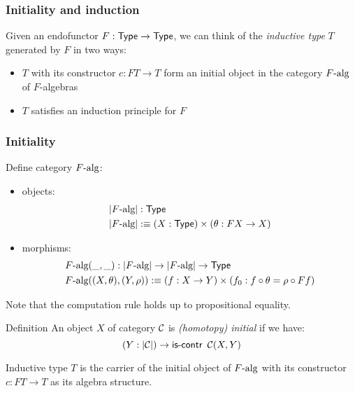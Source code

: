 \documentclass{beamer}
\begin{document}
\begin{frame}
  \frametitle{Initiality and induction}
  Given an endofunctor $F : \mathsf{Type} \to \mathsf{Type}$, we can think of the
  \emph{inductive type} $T$ generated by $F$ in two ways:

  \begin{itemize}
  \item $T$ with its constructor $c : FT \to T$ form an initial object
    in the category $F\mbox{-alg}$ of $F$-algebras
  \item $T$ satisfies an induction principle for $F$
  \end{itemize}
\end{frame}

\begin{frame}
  \frametitle{Initiality}
  Define category $F\mbox{-alg}$:
  \begin{itemize}
  \item objects:
    \begin{align*}
      &| F\mbox{-alg} | : \mathsf{Type} \\
      &| F\mbox{-alg} | :\equiv (X : \mathsf{Type}) \times (\theta : FX \to X) 
    \end{align*}

  \item morphisms: 
    \begin{align*}
      &F\mbox{-alg}(\_,\_) : | F\mbox{-alg} | \to | F\mbox{-alg} | \to \mathsf{Type} \\
      &F\mbox{-alg}((X,\theta),(Y,\rho)) :\equiv (f : X \to Y) \times (f_0 : f \circ \theta = \rho \circ Ff)
    \end{align*}
  \end{itemize}

  Note that the computation rule holds up to propositional equality.

  \begin{block}{Definition}
    An object $X$ of category $\mathcal{C}$ is \emph{(homotopy) initial} if
    we have: 
    $$(Y : | \mathcal{C} |) \to \operatorname{\mathsf{is-contr}} \ \mathcal{C}(X,Y)$$
  \end{block}

  Inductive type $T$ is the carrier of the initial object of
  $F\mbox{-alg}$ with its constructor $c : FT \to T$ as its algebra
  structure.
\end{frame}
\end{document}
